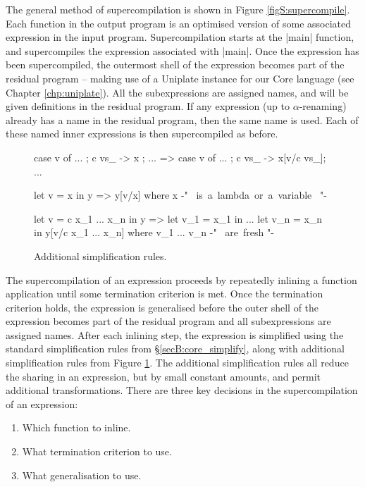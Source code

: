 The general method of supercompilation is shown in Figure \ref{figS:supercompile}. Each function in the output program is an optimised version of some associated expression in the input program. Supercompilation starts at the |main| function, and supercompiles the expression associated with |main|. Once the expression has been supercompiled, the outermost shell of the expression becomes part of the residual program -- making use of a Uniplate instance for our Core language (see Chapter \ref{chp:uniplate}). All the subexpressions are assigned names, and will be given definitions in the residual program. If any expression (up to $\alpha$-renaming) already has a name in the residual program, then the same name is used. Each of these named inner expressions is then supercompiled as before.

\begin{figure}
\ignore\begin{code}
case v of {... ; c vs_ -> x ; ...}
    => case v of {... ; c vs_ -> x[v/c vs_]; ...}

let v = x in y
    => y[v/x]
    where x {-" \hbox{ is a lambda or a variable } "-}

let v = c x_1 ... x_n in y
    =>  let v_1 = x_1 in
        ...
        let v_n = x_n in
        y[v/c x_1 ... x_n]
    where v_1 ... v_n {-" \hbox{ are fresh} "-}
\end{code}
\caption{Additional simplification rules.}
\label{figS:simplify}
\end{figure}

The supercompilation of an expression proceeds by repeatedly inlining a function application until some termination criterion is met. Once the termination criterion holds, the expression is generalised before the outer shell of the expression becomes part of the residual program and all subexpressions are assigned names. After each inlining step, the expression is simplified using the standard simplification rules from \S\ref{secB:core_simplify}, along with additional simplification rules from Figure \ref{figS:simplify}. The additional simplification rules all reduce the sharing in an expression, but by small constant amounts, and permit additional transformations. There are three key decisions in the supercompilation of an expression:

\begin{enumerate}
\item Which function to inline.
\item What termination criterion to use.
\item What generalisation to use.
\end{enumerate}

